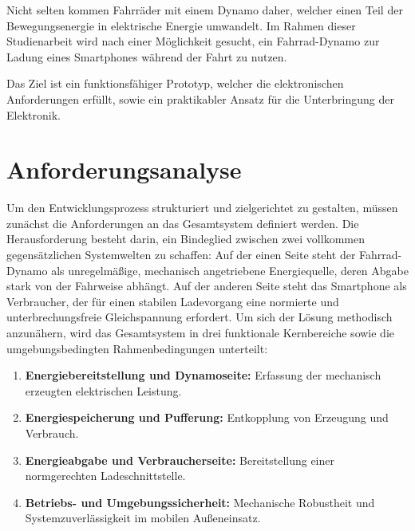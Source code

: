 \documentclass[12pt,a4paper]{article}
\begin{document}
Nicht selten kommen Fahrräder mit einem Dynamo daher, welcher einen Teil der Bewegungsenergie
in elektrische Energie umwandelt. Im Rahmen dieser Studienarbeit wird nach einer Möglichkeit gesucht,  
ein Fahrrad-Dynamo zur Ladung eines Smartphones während der Fahrt zu nutzen.

Das Ziel ist ein funktionsfähiger Prototyp, welcher die elektronischen Anforderungen erfüllt, sowie
ein praktikabler Ansatz für die Unterbringung der Elektronik. 

\section{Anforderungsanalyse} 
\label{sec:anforderungsanalyse}
Um den Entwicklungsprozess strukturiert und zielgerichtet zu gestalten, müssen zunächst die Anforderungen an das 
Gesamtsystem definiert werden. Die Herausforderung besteht darin, ein Bindeglied zwischen zwei vollkommen 
gegensätzlichen Systemwelten zu schaffen: Auf der einen Seite steht der Fahrrad-Dynamo als unregelmäßige, 
mechanisch angetriebene Energiequelle, deren Abgabe stark von der Fahrweise abhängt. Auf der anderen Seite 
steht das Smartphone als Verbraucher, der für einen stabilen Ladevorgang eine normierte und 
unterbrechungsfreie Gleichspannung erfordert. Um sich der Lösung methodisch anzunähern, wird das 
Gesamtsystem in drei funktionale Kernbereiche sowie die umgebungsbedingten Rahmenbedingungen unterteilt:
\begin{enumerate}
    \item \textbf{Energiebereitstellung und Dynamoseite:} Erfassung der mechanisch erzeugten elektrischen Leistung.
    \item \textbf{Energiespeicherung und Pufferung:} Entkopplung von Erzeugung und Verbrauch.
    \item \textbf{Energieabgabe und Verbraucherseite:} Bereitstellung einer normgerechten Ladeschnittstelle.
    \item \textbf{Betriebs- und Umgebungssicherheit:} Mechanische Robustheit und Systemzuverlässigkeit im mobilen Außeneinsatz.
\end{enumerate}
\end{document}
